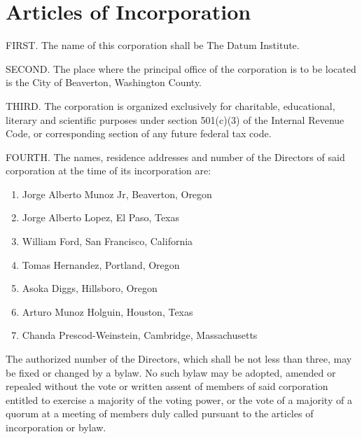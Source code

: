 \section{Articles of Incorporation}

FIRST. The name of this corporation shall be The Datum Institute.

SECOND. The place where the principal office of the corporation is to be located is the City of Beaverton, Washington County.

THIRD. The corporation is organized exclusively for charitable, educational, literary and scientific purposes under section 501(c)(3) of the Internal Revenue Code, or corresponding section of any future federal tax code. 

FOURTH. The names, residence addresses and number of the Directors of said corporation at the time of its incorporation are:

\begin{enumerate}
\item Jorge Alberto Munoz Jr, Beaverton, Oregon
\item Jorge Alberto Lopez, El Paso, Texas
\item William Ford, San Francisco, California
\item Tomas Hernandez, Portland, Oregon
\item Asoka Diggs, Hillsboro, Oregon
\item Arturo Munoz Holguin, Houston, Texas
\item Chanda Prescod-Weinstein, Cambridge, Massachusetts

\end{enumerate}

The authorized number of the Directors, which shall be not less than three, may be fixed or changed by a bylaw.  No such bylaw may be adopted, amended or repealed without the vote or written assent of members of said corporation entitled to exercise a majority of the voting power, or the vote of a majority of a quorum at a meeting of members duly called pursuant to the articles of incorporation or bylaw.


